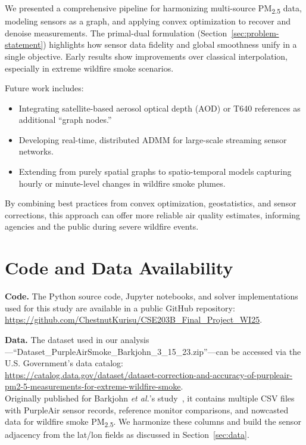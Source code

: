 \documentclass[12pt]{article}                                %
\begin{document}
We presented a comprehensive pipeline for harmonizing multi-source PM\textsubscript{2.5} 
data, modeling sensors as a graph, and applying convex optimization to recover and denoise 
measurements. The primal-dual formulation (Section~\ref{sec:problem-statement}) highlights 
how sensor data fidelity and global smoothness unify in a single objective. Early results 
show improvements over classical interpolation, especially in extreme wildfire smoke scenarios.

Future work includes:
\begin{itemize}
    \item Integrating satellite-based aerosol optical depth (AOD) or T640 references as 
          additional “graph nodes.”
    \item Developing real-time, distributed ADMM for large-scale streaming sensor networks.
    \item Extending from purely spatial graphs to spatio-temporal models capturing hourly 
          or minute-level changes in wildfire smoke plumes.
\end{itemize}

By combining best practices from convex optimization, geostatistics, and sensor corrections, 
this approach can offer more reliable air quality estimates, informing agencies and the public 
during severe wildfire events.


\section{Code and Data Availability}

\noindent
\textbf{Code.} The Python source code, Jupyter notebooks, and solver implementations used for this study are available in a public GitHub repository:\\
\url{https://github.com/ChestnutKurisu/CSE203B_Final_Project_WI25}.

\vspace{1em}
\noindent
\textbf{Data.} The dataset used in our analysis---``Dataset\_PurpleAirSmoke\_Barkjohn\_3\_15\_23.zip''---can be accessed via the U.S. Government’s data catalog:\\
\url{https://catalog.data.gov/dataset/dataset-correction-and-accuracy-of-purpleair-pm2-5-measurements-for-extreme-wildfire-smoke}.\\
Originally published for Barkjohn \emph{et al.}’s study~\cite{Barkjohn2022}, it contains multiple CSV files with PurpleAir sensor records, reference monitor comparisons, and nowcasted data for wildfire smoke PM\textsubscript{2.5}. We harmonize these columns and build the sensor adjacency from the lat/lon fields as discussed in Section~\ref{sec:data}.


\end{document}
